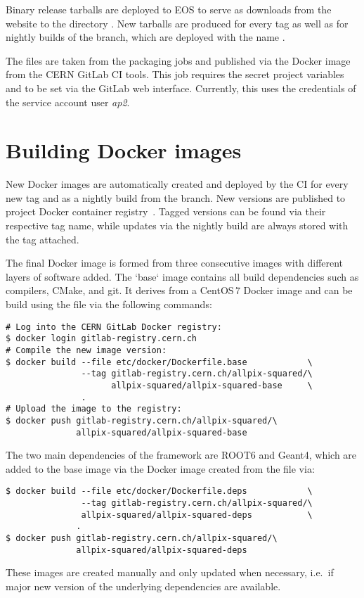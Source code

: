 Binary release tarballs are deployed to EOS to serve as downloads from the website to the directory .
New tarballs are produced for every tag as well as for nightly builds of the  branch, which are deployed with the name .

The files are taken from the packaging jobs and published via the  Docker image from the CERN GitLab CI tools.
This job requires the secret project variables  and  to be set via the GitLab web interface.
Currently, this uses the credentials of the service account user \emph{ap2}.

\section{Building Docker images}
\label{sec:build-docker}

New \apsq Docker images are automatically created and deployed by the CI for every new tag and as a nightly build from the  branch.
New versions are published to project Docker container registry~\cite{ap2-container-registry}.
Tagged versions can be found via their respective tag name, while updates via the nightly build are always stored with the  tag attached.

The final Docker image is formed from three consecutive images with different layers of software added.
The `base` image contains all build dependencies such as compilers, CMake, and git.
It derives from a CentOS\,7 Docker image and can be build using the  file via the following commands:

\begin{verbatim}
# Log into the CERN GitLab Docker registry:
$ docker login gitlab-registry.cern.ch
# Compile the new image version:
$ docker build --file etc/docker/Dockerfile.base            \
               --tag gitlab-registry.cern.ch/allpix-squared/\
                     allpix-squared/allpix-squared-base     \
               .
# Upload the image to the registry:
$ docker push gitlab-registry.cern.ch/allpix-squared/\
              allpix-squared/allpix-squared-base
\end{verbatim}

The two main dependencies of the framework are ROOT6 and Geant4, which are added to the base image via the  Docker image created from the file  via:
\begin{verbatim}
$ docker build --file etc/docker/Dockerfile.deps            \
               --tag gitlab-registry.cern.ch/allpix-squared/\
               allpix-squared/allpix-squared-deps           \
              .
$ docker push gitlab-registry.cern.ch/allpix-squared/\
              allpix-squared/allpix-squared-deps
\end{verbatim}
These images are created manually and only updated when necessary, i.e.\ if major new version of the underlying dependencies are available.

